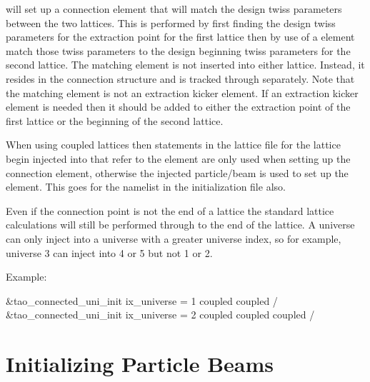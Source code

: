 {{{{{{{{{{ will set up a connection element that will match
the design twiss parameters between the two lattices. This is
performed by first finding the design twiss parameters for the
extraction point for the first lattice then by use of a \bmad
{} element match those twiss parameters to the design
beginning twiss parameters for the second lattice. The matching
element is not inserted into either lattice. Instead, it resides in
the \tao connection structure and is tracked through separately. Note
that the matching element is not an extraction kicker element. If an
extraction kicker element is needed then it should be added to either
the extraction point of the first lattice or the beginning of the
second lattice.

When using coupled lattices then statements in the lattice file for
the lattice begin injected into that refer to the 
element are only used when setting up the connection element, otherwise
the injected particle/beam is used to set up the 
element. This goes for the  namelist in the
initialization file also.

Even if the connection point is not the end of a lattice the standard lattice
calculations will still be performed through to the end of the
lattice.  A universe can only inject into a universe with a greater
universe index, so for example, universe 3 can inject into 4 or 5 but
not 1 or 2.

Example:
\begin{example}
  &tao_connected_uni_init
    ix_universe = 1
    coupled%
    coupled%
  /
  &tao_connected_uni_init
    ix_universe = 2
    coupled%
    coupled%
    coupled%
  /
\end{example}

\section{Initializing Particle Beams}
\label{s:beam_init}

}}}}}}}}}}
